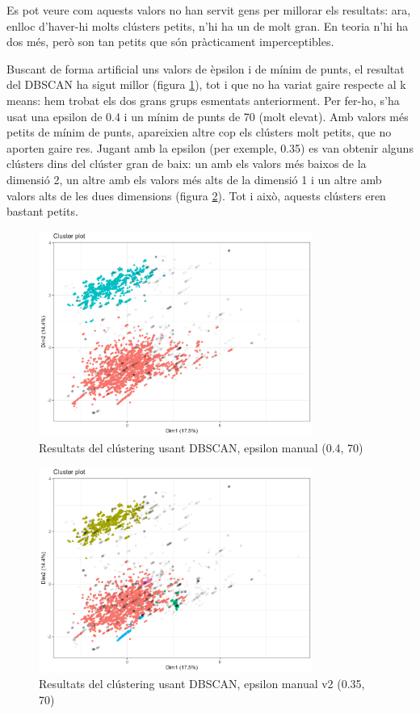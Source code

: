 \documentclass{article}
\begin{document}
Es pot veure com aquests valors no han servit gens per millorar els resultats: ara, enlloc d'haver-hi molts clústers petits, n'hi ha un de molt gran. En teoria n'hi ha dos més, però son tan petits que són pràcticament imperceptibles.

Buscant de forma artificial uns valors de èpsilon i de mínim de punts, el resultat del DBSCAN ha sigut millor (figura \ref{fig:DBSCAN_manual}), tot i que no ha variat gaire respecte al k means: hem trobat els dos grans grups esmentats anteriorment. Per fer-ho, s'ha usat una epsilon de 0.4 i un mínim de punts de 70 (molt elevat). Amb valors més petits de mínim de punts, apareixien altre cop els clústers molt petits, que no aporten gaire res. Jugant amb la epsilon (per exemple, 0.35) es van obtenir alguns clústers dins del clúster gran de baix: un amb els valors més baixos de la dimensió 2, un altre amb els valors més alts de la dimensió 1 i un altre amb valors alts de les dues dimensions (figura \ref{fig:DBSCAN_manual2}). Tot i això, aquests clústers eren bastant petits.

\begin{figure}[H]
    \centering
    \includegraphics[width=0.8\textwidth]{Images/4_clustering/DBSCAN/dbscanforca.png}
    \caption{Resultats del clústering usant DBSCAN, epsilon manual (0.4, 70)}
    \label{fig:DBSCAN_manual}
\end{figure}

\begin{figure}[H]
    \centering
    \includegraphics[width=0.8\textwidth]{Images/4_clustering/DBSCAN/dbscanforcaalt.png}
    \caption{Resultats del clústering usant DBSCAN, epsilon manual v2 (0.35, 70)}
    \label{fig:DBSCAN_manual2}
\end{figure}
\end{document}

